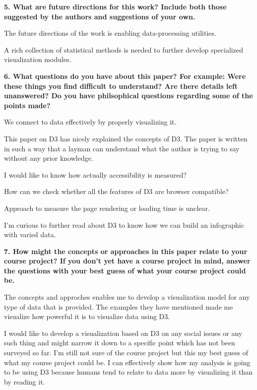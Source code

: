 \documentclass{article}[12pt]
\begin{document}
\vspace{2ex}\noindent
{\bf 5. What are future directions for this work? Include both those suggested by
   the authors and suggestions of your own.}

{
	The future directions of the work is enabling data-processing utilities.

	A rich collection of statistical methods is needed to further develop specialized visualization modules. 

}



\vspace{2ex}\noindent
{\bf 6. What questions do you have about this paper? For example: Were these things
   you find difficult to understand? Are there details left unanswered? Do you
have philsophical questions regarding some of the points made? }


{
	We connect to data effectively by properly visualizing it.  

	This paper on D3 has nicely explained the concepts of D3. The paper is written in such a way that a layman can understand what the author is trying to say without any prior knowledge. 

	I would like to know how actually accessibility is measured? 

	How can we check whether all the features of D3 are browser compatible?

	Approach to measure the page rendering or loading time is unclear.

	I'm curious to further read about D3 to know how we can build an infographic with varied data.

}



\vspace{2ex}\noindent
{\bf 7. How might the concepts or approaches in this paper relate to your course
   project? If you don't yet have a course project in mind, answer the
questions with your best guess of what your course project could be. }

{
	The concepts and approches enables me to develop a visualization model for any type of data that is provided.
	The examples they have mentioned made me visualize how powerful it is to visualize data using D3. 

	I would like to develop a visualization based on D3 on any social issues or any such thing and might narrow it down to a specific point which has not been surveyed so far. I'm still not sure of the course project but this my best guess of what my course project could be. I can effectively show how my analysis is going to be using D3 because humans tend to relate to data more by visualizing it than by reading it. 
}
\end{document}
